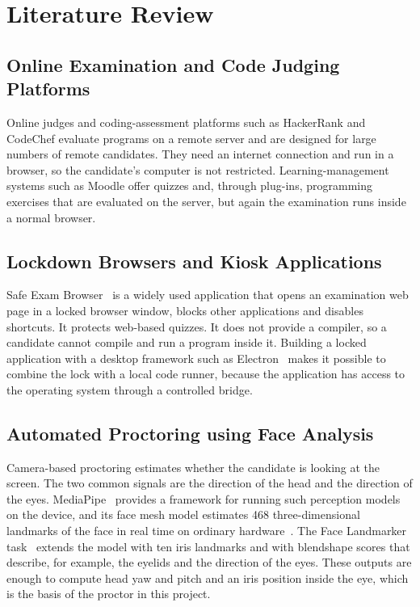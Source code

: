 \documentclass[12pt,a4paper]{report}
\begin{document}
\chapter{Literature Review}

\section{Online Examination and Code Judging Platforms}
Online judges and coding-assessment platforms such as HackerRank and CodeChef evaluate programs on a remote server and are designed for large numbers of remote candidates. They need an internet connection and run in a browser, so the candidate's computer is not restricted. Learning-management systems such as Moodle offer quizzes and, through plug-ins, programming exercises that are evaluated on the server, but again the examination runs inside a normal browser.

\section{Lockdown Browsers and Kiosk Applications}
Safe Exam Browser~\cite{seb} is a widely used application that opens an examination web page in a locked browser window, blocks other applications and disables shortcuts. It protects web-based quizzes. It does not provide a compiler, so a candidate cannot compile and run a program inside it. Building a locked application with a desktop framework such as Electron~\cite{electron} makes it possible to combine the lock with a local code runner, because the application has access to the operating system through a controlled bridge.

\section{Automated Proctoring using Face Analysis}
Camera-based proctoring estimates whether the candidate is looking at the screen. The two common signals are the direction of the head and the direction of the eyes. MediaPipe~\cite{mediapipe} provides a framework for running such perception models on the device, and its face mesh model estimates 468 three-dimensional landmarks of the face in real time on ordinary hardware~\cite{kartynnik}. The Face Landmarker task~\cite{landmarker} extends the model with ten iris landmarks and with blendshape scores that describe, for example, the eyelids and the direction of the eyes. These outputs are enough to compute head yaw and pitch and an iris position inside the eye, which is the basis of the proctor in this project.
\end{document}
